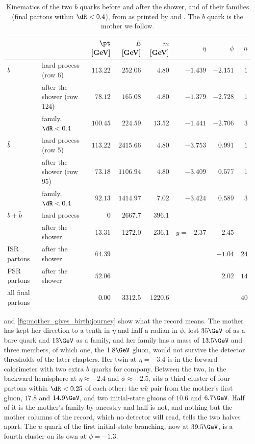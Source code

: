 \begin{table}[htbp]\centering\small
\caption[Kinematics of the two $b$ quarks and their families after the shower]{Kinematics
of the two $b$ quarks before and after the shower, and of their families
(final partons within $\dR<0.4$), from  as printed by
 and . The
$b$ quark is the mother we follow.}
\label{tab:mother_gives_birth:kinematics}
\footnotesize
\begin{tabular}{llrrrrrr}\toprule
 & & $\pt$ [GeV] & $E$ [GeV] & $m$ [GeV] & $\eta$ & $\phi$ & $n$ \\ \midrule
$b$ & hard process (row 6) & $113.22$ & $252.06$ & $4.80$ & $-1.439$ & $-2.151$ & $1$ \\
    & after the shower (row 124) & $78.12$ & $165.08$ & $4.80$ & $-1.379$ & $-2.728$ & $1$ \\
    & family, $\dR<0.4$ & $100.45$ & $224.59$ & $13.52$ & $-1.441$ & $-2.706$ & $3$ \\ \midrule
$\bar b$ & hard process (row 5) & $113.22$ & $2415.66$ & $4.80$ & $-3.753$ & $0.991$ & $1$ \\
    & after the shower (row 95) & $73.18$ & $1106.94$ & $4.80$ & $-3.409$ & $0.577$ & $1$ \\
    & family, $\dR<0.4$ & $92.13$ & $1414.97$ & $7.02$ & $-3.424$ & $0.589$ & $3$ \\ \midrule
$b+\bar b$ & hard process & $0$ & $2667.7$ & $396.1$ & & & \\
    & after the shower & $13.31$ & $1272.0$ & $236.1$ & $y=-2.37$ & $2.45$ & \\ \midrule
ISR partons & after the shower & $64.39$ & & & & $-1.04$ & $24$ \\
FSR partons & after the shower & $52.06$ & & & & $2.02$ & $14$ \\
all final partons & & $0.00$ & $3312.5$ & $1220.6$ & & & $40$ \\
\bottomrule
\end{tabular}
\end{table}

 and \cref{fig:mother_gives_birth:journey}
show what the record means. The mother has kept her direction to a tenth
in $\eta$ and half a radian in $\phi$, lost $35\GeV$ of \pt as a bare
quark and $13\GeV$ as a family, and her family has a mass of $13.5\GeV$
and three members, of which one, the $1.8\GeV$ gluon, would not survive
the detector thresholds of the later chapters. Her twin at $\eta=-3.4$ is
in the forward calorimeter with two extra $b$ quarks for company. Between
the two, in the backward hemisphere at $\eta\approx-2.4$ and
$\phi\approx-2.5$, sits a third cluster of four partons within $\dR<0.25$
of each other: the $u\bar u$ pair from the mother's first gluon, $17.8$ and
$14.9\GeV$, and two initial-state gluons of $10.6$ and $6.7\GeV$. Half of
it is the mother's family by ancestry and half is not, and nothing but the
mother columns of the record, which no detector will read, tells the two
halves apart. The $u$ quark of the first initial-state branching, now at
$39.5\GeV$, is a fourth cluster on its own at $\phi=-1.3$.

